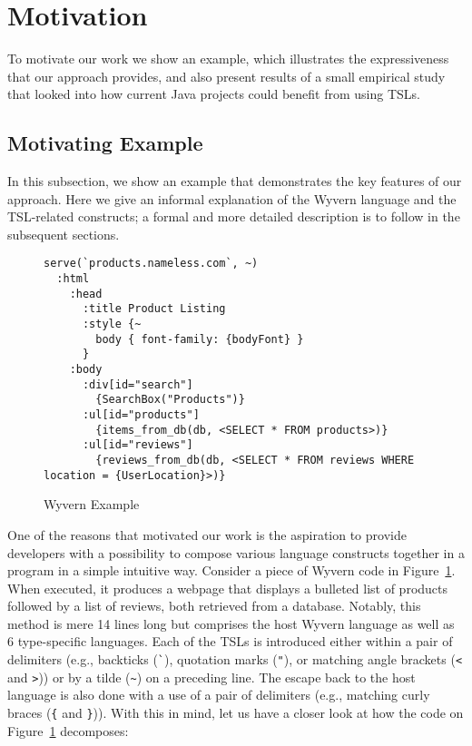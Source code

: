 \section{Motivation}
\label{s:motivation}

To motivate our work we show an example, which illustrates the expressiveness that our approach provides, and also present results of a small empirical study that looked into how current Java projects could  benefit from using TSLs.

\subsection{Motivating Example}

In this subsection, we show an example that demonstrates the key features of our approach. Here we give an informal explanation of the Wyvern language and the TSL-related constructs; a formal and more detailed description is to follow in the subsequent sections.


\begin{figure}
\begin{lstlisting}
serve(`products.nameless.com`, ~)
  :html
    :head
      :title Product Listing
      :style {~
        body { font-family: {bodyFont} }
      }
    :body
      :div[id="search"]
        {SearchBox("Products")}
      :ul[id="products"]
        {items_from_db(db, <SELECT * FROM products>)}
      :ul[id="reviews"]
        {reviews_from_db(db, <SELECT * FROM reviews WHERE location = {UserLocation}>)}
\end{lstlisting}
\caption{Wyvern Example}
\label{f-example}
\end{figure}


One of the reasons that motivated our work is the aspiration to provide developers with a possibility to compose various language constructs together in a program in a simple intuitive way. Consider a piece of Wyvern code in Figure~\ref{f-example}. When executed, it produces a webpage that displays a bulleted list of products followed by a list of reviews, both retrieved from a database. Notably, this method is mere 14 lines long but comprises the host Wyvern language as well as 6 type-specific languages. Each of the TSLs is introduced either within a pair of delimiters (e.g., backticks (\lstinline{`}), quotation marks (\lstinline{"}), or matching angle brackets (\lstinline{<} and \lstinline{>})) or by a tilde (\lstinline{~}) on a preceding line. The escape back to the host language is also done with a use of a pair of delimiters (e.g., matching curly braces (\lstinline|{| and \lstinline|}|)). With this in mind, let us have a closer look at how the code on Figure~\ref{f-example} decomposes:

